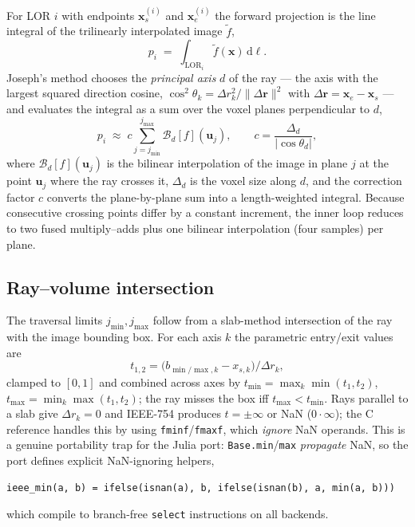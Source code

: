 \documentclass[11pt,a4paper]{article}
\begin{document}
For LOR $i$ with endpoints $\mathbf{x}_s^{(i)}$ and $\mathbf{x}_e^{(i)}$ the
forward projection is the line integral of the trilinearly interpolated image
$\tilde f$,
\begin{equation}
  p_i \;=\; \int_{\mathrm{LOR}_i} \tilde f(\mathbf{x})\,\mathrm{d}\ell .
\end{equation}
Joseph's method chooses the \emph{principal axis} $d$ of the ray --- the axis
with the largest squared direction cosine,
$\cos^2\theta_k = \Delta r_k^2 / \lVert \Delta\mathbf{r} \rVert^2$ with
$\Delta\mathbf{r} = \mathbf{x}_e - \mathbf{x}_s$ --- and evaluates the
integral as a sum over the voxel planes perpendicular to $d$,
\begin{equation}
  p_i \;\approx\; c \sum_{j=j_{\min}}^{j_{\max}}
      \mathcal{B}_d\!\left[f\right]\!\left(\mathbf{u}_j\right),
  \qquad
  c = \frac{\Delta_d}{\lvert\cos\theta_d\rvert},
  \label{eq:joseph}
\end{equation}
where $\mathcal{B}_d[f](\mathbf{u}_j)$ is the bilinear interpolation of the
image in plane $j$ at the point $\mathbf{u}_j$ where the ray crosses it,
$\Delta_d$ is the voxel size along $d$, and the correction factor $c$ converts
the plane-by-plane sum into a length-weighted integral. Because consecutive
crossing points differ by a constant increment, the inner loop reduces to two
fused multiply--adds plus one bilinear interpolation (four samples) per plane.

\subsection{Ray--volume intersection}

The traversal limits $j_{\min}, j_{\max}$ follow from a slab-method
intersection of the ray with the image bounding box. For each axis $k$ the
parametric entry/exit values are
\begin{equation}
  t_{1,2} = \bigl(b_{\min/\max,k} - x_{s,k}\bigr)/\Delta r_k ,
\end{equation}
clamped to $[0,1]$ and combined across axes by
$t_{\min} = \max_k \min(t_1,t_2)$, $t_{\max} = \min_k \max(t_1,t_2)$; the ray
misses the box iff $t_{\max} < t_{\min}$. Rays parallel to a slab give
$\Delta r_k = 0$ and IEEE-754 produces $t = \pm\infty$ or NaN ($0 \cdot
\infty$); the C reference handles this by using \texttt{fminf}/\texttt{fmaxf},
which \emph{ignore} NaN operands. This is a genuine portability trap for the
Julia port: \texttt{Base.min}/\texttt{max} \emph{propagate} NaN, so the port
defines explicit NaN-ignoring helpers,
\begin{lstlisting}
ieee_min(a, b) = ifelse(isnan(a), b, ifelse(isnan(b), a, min(a, b)))
\end{lstlisting}
which compile to branch-free \texttt{select} instructions on all backends.
\end{document}
